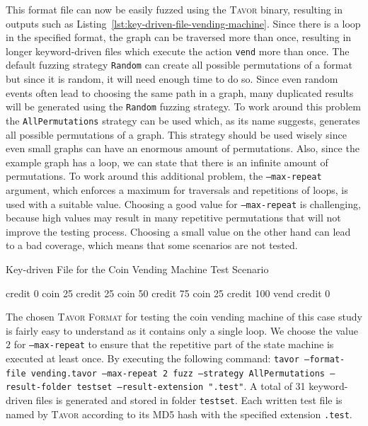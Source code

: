 This format file can now be easily fuzzed using the \textsc{Tavor} binary, resulting in outputs such as Listing~\ref{lst:key-driven-file-vending-machine}. Since there is a loop in the specified format, the graph can be traversed more than once, resulting in longer keyword-driven files which execute the action \texttt{vend} more than once. The default fuzzing strategy \texttt{Random} can create all possible permutations of a format but since it is random, it will need enough time to do so. Since even random events often lead to choosing the same path in a graph, many duplicated results will be generated using the \texttt{Random} fuzzing strategy. To work around this problem the \texttt{AllPermutations} strategy can be used which, as its name suggests, generates all possible permutations of a graph. This strategy should be used wisely since even small graphs can have an enormous amount of permutations. Also, since the example graph has a loop, we can state that there is an infinite amount of permutations. To work around this additional problem, the \texttt{---max-repeat} argument, which enforces a maximum for traversals and repetitions of loops, is used with a suitable value. Choosing a good value for \texttt{---max-repeat} is challenging, because high values may result in many repetitive permutations that will not improve the testing process. Choosing a small value on the other hand can lead to a bad coverage, which means that some scenarios are not tested.

\begin{listing}
\caption{Key-driven File for the Coin Vending Machine Test Scenario}
\label{lst:key-driven-file-vending-machine}
\begin{textcode}
credit  0
coin    25
credit  25
coin    50
credit  75
coin    25
credit  100
vend
credit  0
\end{textcode}
\end{listing}

The chosen \textsc{Tavor Format} for testing the coin vending machine of this case study is fairly easy to understand as it contains only a single loop. We choose the value $2$ for \texttt{\mbox{---max-repeat}} to ensure that the repetitive part of the state machine is executed at least once. By executing the following command: \texttt{tavor ---format-file vending.tavor ---max-repeat 2 fuzz ---strategy AllPermutations ---result-folder testset ---result-extension ".test"}. A total of 31 keyword-driven files is generated and stored in folder \texttt{testset}. Each written test file is named by \textsc{Tavor} according to its MD5 hash with the specified extension \texttt{.test}.

